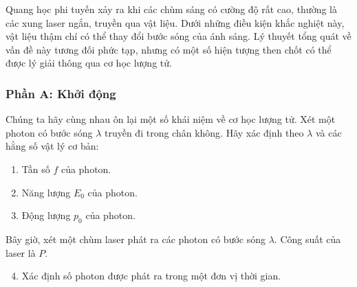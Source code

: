 \noindent Quang học phi tuyến xảy ra khi các chùm sáng có cường độ rất cao, thường là các xung laser ngắn, truyền qua vật liệu. Dưới những điều kiện khắc nghiệt này, vật liệu thậm chí có thể thay đổi bước sóng của ánh sáng. Lý thuyết tổng quát về vấn đề này tương đối phức tạp, nhưng có một số hiện tượng then chốt có thể được lý giải thông qua cơ học lượng tử.

\subsubsection*{Phần A: Khởi động}
\noindent Chúng ta hãy cùng nhau ôn lại một số khái niệm về cơ học lượng tử. Xét một photon có bước sóng $\lambda$ truyền đi trong chân không. Hãy xác định theo $\lambda$ và các hằng số vật lý cơ bản:
\begin{enumerate}
  \item Tần số $f$ của photon.
  \item Năng lượng $E_0$ của photon.
  \item Động lượng $p_0$ của photon.
\end{enumerate}
Bây giờ, xét một chùm laser phát ra các photon có bước sóng $\lambda$. Công suất của laser là $P$.
\begin{enumerate}
  \setcounter{enumi}{3}
  \item Xác định số photon được phát ra trong một đơn vị thời gian.
\end{enumerate}

